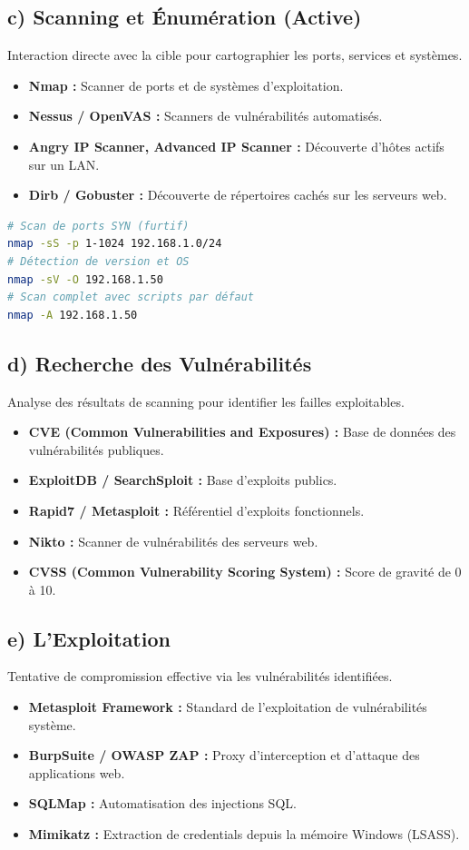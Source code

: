 \subsection{c) Scanning et Énumération (Active)}
Interaction directe avec la cible pour cartographier les ports, services et systèmes.
\begin{itemize}
    \item \textbf{Nmap :} Scanner de ports et de systèmes d'exploitation.
    \item \textbf{Nessus / OpenVAS :} Scanners de vulnérabilités automatisés.
    \item \textbf{Angry IP Scanner, Advanced IP Scanner :} Découverte d'hôtes actifs sur un LAN.
    \item \textbf{Dirb / Gobuster :} Découverte de répertoires cachés sur les serveurs web.
\end{itemize}

\begin{lstlisting}[language=bash, caption=Commandes Nmap courantes]
# Scan de ports SYN (furtif)
nmap -sS -p 1-1024 192.168.1.0/24
# Détection de version et OS
nmap -sV -O 192.168.1.50
# Scan complet avec scripts par défaut
nmap -A 192.168.1.50
\end{lstlisting}

\subsection{d) Recherche des Vulnérabilités}
Analyse des résultats de scanning pour identifier les failles exploitables.
\begin{itemize}
    \item \textbf{CVE (Common Vulnerabilities and Exposures) :} Base de données des vulnérabilités publiques.
    \item \textbf{ExploitDB / SearchSploit :} Base d'exploits publics.
    \item \textbf{Rapid7 / Metasploit :} Référentiel d'exploits fonctionnels.
    \item \textbf{Nikto :} Scanner de vulnérabilités des serveurs web.
    \item \textbf{CVSS (Common Vulnerability Scoring System) :} Score de gravité de 0 à 10.
\end{itemize}

\subsection{e) L'Exploitation}
Tentative de compromission effective via les vulnérabilités identifiées.
\begin{itemize}
    \item \textbf{Metasploit Framework :} Standard de l'exploitation de vulnérabilités système.
    \item \textbf{BurpSuite / OWASP ZAP :} Proxy d'interception et d'attaque des applications web.
    \item \textbf{SQLMap :} Automatisation des injections SQL.
    \item \textbf{Mimikatz :} Extraction de credentials depuis la mémoire Windows (LSASS).
\end{itemize}

